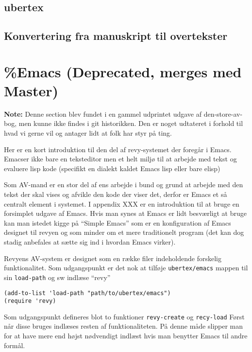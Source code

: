\documentclass[10pt,a4paper,danish]{article}
\let\oldmarginnote\marginnote
\renewcommand{\marginnote}[1]{\oldmarginnote{\raggedright{}\footnotesize #1}}
\newcommand{\note}[1]{\begin{mdframed}[style=note]\textbf{Note:}
    #1\end{mdframed}}
\newcommand{\code}[1]{\colorbox{verbgray}{\texttt{#1}}}
\begin{document}
\subsection{ubertex}
\label{subsec:ubertex}
\subsection{Konvertering fra manuskript til overtekster}
\label{subsec:konvertering-manus-overtekst}

\newpage
\section*{\%Emacs (Deprecated, merges med Master)}
\note{Denne section blev fundet i en gammel udprintet udgave af
  den-store-av-bog, men kunne ikke findes i git historikken.
Den er noget udtateret i forhold til hvad vi gerne vil og antager lidt at folk
har styr på ting.}

Her er en kort introduktion til den del af revy-systemet der foregår i Emacs.
Emacser ikke bare en teksteditor men et helt miljø til at arbejde med tekst og
evaluere lisp kode (specifikt en dialekt kaldet Emacs lisp eller bare elisp)

Som AV-mand er en stor del af ens arbejde i bund og grund at arbejde med den
tekst der skal vises og afvikle den kode der viser det, derfor er Emacs et så
centralt element i systemet. I appendix XXX\marginnote{\note{Nej der er ej}} er en
introduktion til at bruge en forsimplet udgave af Emacs. Hvis man synes at Emacs
er lidt besværligt at bruge kan man istedet kigge på ``Simple Emacs'' som er en
konfiguration af Emacs designet til revyen og som minder om et mere traditionelt
program (det kan dog stadig anbefales at sætte sig ind i hvordan Emacs virker).

Revyens AV-system er designet som en række filer indeholdende forskelig
funktionalitet. Som udgangspunkt er det nok at tilføje \code{ubertex/emacs}
mappen til sin \code{load-path} og sw indlæse ``revy''

\begin{verbatim}
(add-to-list 'load-path "path/to/ubertex/emacs")
(require 'revy)
\end{verbatim}

Som udgangspunkt defineres blot to funktioner \code{revy-create} og
\code{recy-load} Først når disse bruges indlæses resten af funktionaliteten. På
denne måde slipper man for at have mere end højst nødvendigt indlæst hvis man
benytter Emacs til andre formål.
\end{document}
